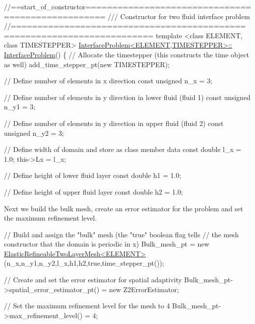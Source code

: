 \begin{DoxyCodeInclude}
\textcolor{comment}{//==start\_of\_constructor==================================================}
\textcolor{comment}{/// Constructor for two fluid interface problem}
\textcolor{comment}{}\textcolor{comment}{//========================================================================}
\textcolor{keyword}{template} <\textcolor{keyword}{class} ELEMENT, \textcolor{keyword}{class} TIMESTEPPER>
\hyperlink{classInterfaceProblem_a5889be7fc8eab5d222f1bfb750c845ba}{InterfaceProblem<ELEMENT,TIMESTEPPER>::}
\hyperlink{classInterfaceProblem_a5889be7fc8eab5d222f1bfb750c845ba}{InterfaceProblem}()
\{
 \textcolor{comment}{// Allocate the timestepper (this constructs the time object as well)}
 add\_time\_stepper\_pt(\textcolor{keyword}{new} TIMESTEPPER);

 \textcolor{comment}{// Define number of elements in x direction}
 \textcolor{keyword}{const} \textcolor{keywordtype}{unsigned} n\_x = 3;
   
 \textcolor{comment}{// Define number of elements in y direction in lower fluid (fluid 1)}
 \textcolor{keyword}{const} \textcolor{keywordtype}{unsigned} n\_y1 = 3;

 \textcolor{comment}{// Define number of elements in y direction in upper fluid (fluid 2)}
 \textcolor{keyword}{const} \textcolor{keywordtype}{unsigned} n\_y2 = 3;

 \textcolor{comment}{// Define width of domain and store as class member data}
 \textcolor{keyword}{const} \textcolor{keywordtype}{double} l\_x = 1.0;
 this->Lx = l\_x;

 \textcolor{comment}{// Define height of lower fluid layer}
 \textcolor{keyword}{const} \textcolor{keywordtype}{double} h1 = 1.0;

 \textcolor{comment}{// Define height of upper fluid layer}
 \textcolor{keyword}{const} \textcolor{keywordtype}{double} h2 = 1.0;

\end{DoxyCodeInclude}


Next we build the bulk mesh, create an error estimator for the problem and set the maximum refinement level.


\begin{DoxyCodeInclude}
 \textcolor{comment}{// Build and assign the "bulk" mesh (the "true" boolean flag tells}
 \textcolor{comment}{// the mesh constructor that the domain is periodic in x)}
 Bulk\_mesh\_pt = \textcolor{keyword}{new} \hyperlink{classElasticRefineableTwoLayerMesh}{ElasticRefineableTwoLayerMesh<ELEMENT>}
  (n\_x,n\_y1,n\_y2,l\_x,h1,h2,\textcolor{keyword}{true},time\_stepper\_pt());

 \textcolor{comment}{// Create and set the error estimator for spatial adaptivity}
 Bulk\_mesh\_pt->spatial\_error\_estimator\_pt() = \textcolor{keyword}{new} Z2ErrorEstimator;

 \textcolor{comment}{// Set the maximum refinement level for the mesh to 4}
 Bulk\_mesh\_pt->max\_refinement\_level() = 4;

\end{DoxyCodeInclude}


